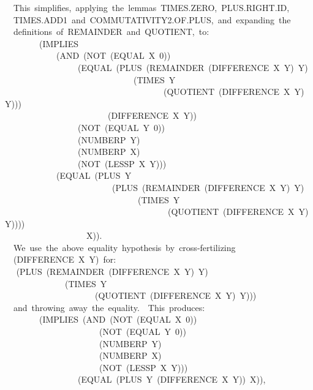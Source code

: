 \documentclass[10pt]{book}
\newenvironment{pubasis}{\begin{flushleft}}{\end{flushleft}}
\begin{document}
\begin{pubasis}
~~This~simplifies,~applying~the~lemmas~TIMES.ZERO,~PLUS.RIGHT.ID,\\
~~TIMES.ADD1~and~COMMUTATIVITY2.OF.PLUS,~and~expanding~the\\
~~definitions~of~REMAINDER~and~QUOTIENT,~to:\\

~~~~~~~~(IMPLIES\\
~~~~~~~~~~~~(AND~(NOT~(EQUAL~X~0))\\
~~~~~~~~~~~~~~~~~(EQUAL~(PLUS~(REMAINDER~(DIFFERENCE~X~Y)~Y)\\
~~~~~~~~~~~~~~~~~~~~~~~~~~~~~~(TIMES~Y\\
~~~~~~~~~~~~~~~~~~~~~~~~~~~~~~~~~~~~~(QUOTIENT~(DIFFERENCE~X~Y)~Y)))\\
~~~~~~~~~~~~~~~~~~~~~~~~(DIFFERENCE~X~Y))\\
~~~~~~~~~~~~~~~~~(NOT~(EQUAL~Y~0))\\
~~~~~~~~~~~~~~~~~(NUMBERP~Y)\\
~~~~~~~~~~~~~~~~~(NUMBERP~X)\\
~~~~~~~~~~~~~~~~~(NOT~(LESSP~X~Y)))\\
~~~~~~~~~~~~(EQUAL~(PLUS~Y\\
~~~~~~~~~~~~~~~~~~~~~~~~~(PLUS~(REMAINDER~(DIFFERENCE~X~Y)~Y)\\
~~~~~~~~~~~~~~~~~~~~~~~~~~~~~~~(TIMES~Y\\
~~~~~~~~~~~~~~~~~~~~~~~~~~~~~~~~~~~~~~(QUOTIENT~(DIFFERENCE~X~Y)~Y))))\\
~~~~~~~~~~~~~~~~~~~X)).\\

~~We~use~the~above~equality~hypothesis~by~cross-fertilizing\\
~~(DIFFERENCE~X~Y)~for:\\
~~	(PLUS~(REMAINDER~(DIFFERENCE~X~Y)~Y)\\
~~~~~~~~~~~~~~(TIMES~Y\\
~~~~~~~~~~~~~~~~~~~~~(QUOTIENT~(DIFFERENCE~X~Y)~Y)))\\
~~and~throwing~away~the~equality.~~This~produces:\\

~~~~~~~~(IMPLIES~(AND~(NOT~(EQUAL~X~0))\\
~~~~~~~~~~~~~~~~~~~~~~(NOT~(EQUAL~Y~0))\\
~~~~~~~~~~~~~~~~~~~~~~(NUMBERP~Y)\\
~~~~~~~~~~~~~~~~~~~~~~(NUMBERP~X)\\
~~~~~~~~~~~~~~~~~~~~~~(NOT~(LESSP~X~Y)))\\
~~~~~~~~~~~~~~~~~(EQUAL~(PLUS~Y~(DIFFERENCE~X~Y))~X)),\\


\end{pubasis}
\end{document}
